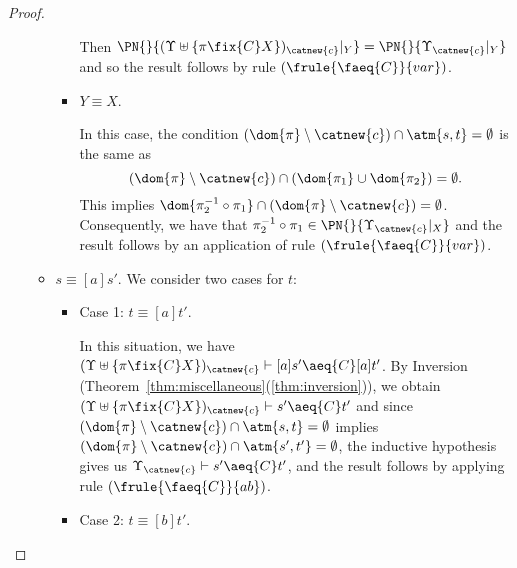 \begin{proof}
\begin{enumerate}
\begin{itemize}
\begin{itemize}
            Then $\PN{}{(\Upsilon\uplus\{\pi\fix{C} X\})_{\catnew{c}}|_Y} = \PN{}{\Upsilon_{\catnew{c}}|_Y}$ and so the result follows by rule $(\frule{\faeq{C}}{var})$.

            \item $Y\equiv X$.

            In this case, the condition $(\dom{\pi}\setminus\catnew{c})\cap\atm{s,t} = \emptyset$ is the same as
            \[
                (\dom{\pi}\setminus\catnew{c})\cap(\dom{\pi_1}\cup\dom{\pi_2}) = \emptyset.
            \]
            This implies $\dom{\pi_2^{-1}\circ\pi_1}\cap (\dom{\pi}\setminus\catnew{c}) = \emptyset$. Consequently, we have that $\pi_2^{-1}\circ\pi_1\in\PN{}{\Upsilon_{\catnew{c}}|_X}$ and the result follows by an application of rule $(\frule{\faeq{C}}{var})$.
        \end{itemize}

        \item $s \equiv [a]s'$. We consider two cases for $t$:

            \begin{itemize}
                \item Case 1: $t \equiv [a]t'$.

                In this situation, we have $(\Upsilon\uplus\{\pi\fix{C} X\})_{\catnew{c}} \vdash [a]s' \aeq{C} [a]t'$. By Inversion (Theorem~\ref{thm:miscellaneous}(\ref{thm:inversion})), we obtain $(\Upsilon\uplus\{\pi\fix{C} X\})_{\catnew{c}} \vdash s' \aeq{C} t'$ and since $(\dom{\pi}\setminus\catnew{c})\cap \atm{s,t} = \emptyset$ implies $(\dom{\pi}\setminus\catnew{c})\cap \atm{s',t'} = \emptyset$, the inductive hypothesis gives us $\Upsilon_{\catnew{c}} \vdash s'\aeq{C} t'$, and the result follows by applying rule $(\frule{\faeq{C}}{ab})$.


                \item Case 2: $t \equiv [b]t'$.


\end{itemize}
\end{itemize}
\end{enumerate}
\end{proof}
